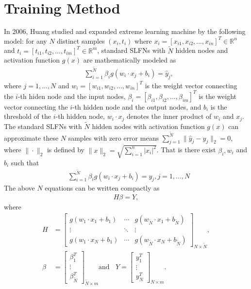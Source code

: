 \section{Training Method}\label{sec:training}

In 2006, Huang \cite{huang2006extreme} studied and expanded  extreme learning machine
by the following model: for any $N$ distinct samples  $(x_i,t_i)$ where $x_i=[x_{i1}, x_{i2},...,x_{in}]^T\in\mathbb{R}^n$ and $t_i=[t_{i1}, t_{i2},...,t_{im}]^T\in\mathbb{R}^m$, standard SLFNs with $\tilde{N}$  hidden nodes and activation function $g(x)$ are mathematically modeled as\\
\begin{align}
&\sum\limits_{i=1}^{\tilde{N}}\beta_ig(w_i\cdot x_j+b_i)=\hat y_j, 
\end{align}
where $j=1,...,N$ and $w_i=[w_{i1}, w_{i2},...,w_{in}]^T$ is the weight vector connecting the $i$-th hiden node and the input nodes, $\beta_i=[\beta_{i1}, \beta_{i2},...,\beta_{im}]^T$ is the weight vector connecting the $i$-th hidden node and the output nodes, and $b_i$ is the threshold of the $i$-th hidden node, $w_i\cdot x_j$ denotes the inner product of $w_i$ and $x_j$. The standard SLFNs with $\tilde{N}$ hidden nodes with activation function $g(x)$ can approximate these $N$ samples with zero error means $\sum\limits_{j=1}^{\tilde{N}}\|\hat y_j-y_j\|_2=0$, where $\|\cdot\|_2$ is defined by $\|x\|_2=\sqrt{\sum\limits_{i=1}^n|x_i|^2}$. That is there exist $\beta_i, w_i$ and $b_i$ such that
\begin{align}
&\sum\limits_{i=1}^{\tilde{N}}\beta_ig(w_i\cdot x_j+b_i)=y_j, j=1,...,N
\end{align}
The above $N$ equations can be written compactly as 
\begin{align}
H\beta=Y,
\end{align}
where
\begin{align}
H &=\begin{bmatrix}
g(w_1\cdot x_1+b_1) & \cdots & g(w_{\tilde{N}}\cdot x_1+b_{\tilde{N}})\\
\vdots & \ddots & \vdots\\
g(w_1\cdot x_N+b_1)  & \cdots & g(w_{\tilde{N}}\cdot x_N+b_{\tilde{N}}) 
\end{bmatrix}_{N\times\tilde{N}},\\
\beta&=
\begin{bmatrix}
\beta_1^T\\
\vdots\\
\beta_{\tilde{N}}^T
\end{bmatrix}_{\tilde{N}\times m}
\text{and}~~~~
Y=\begin{bmatrix}
y_1^T\\
\vdots\\
y_N^T
\end{bmatrix}_{N\times m}.
\end{align}
